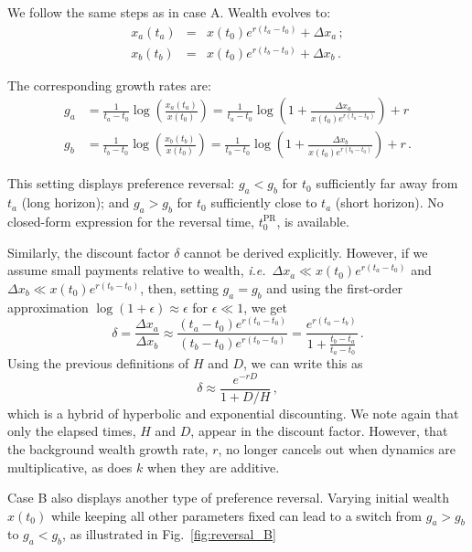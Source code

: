 \documentclass[11pt]{article}
\newcommand{\ie}{{\it i.e.}\ }
\newcommand{\fref}[1]{Fig.~\ref{fig:#1}}
\newcommand{\be}{\begin{equation}}
\newcommand{\ee}{\end{equation}}
\newcommand{\bea}{\begin{eqnarray}}
\newcommand{\eea}{\end{eqnarray}}
\newcommand{\Dx}{\Delta x}
\newcommand{\del}{D}
\newcommand{\hor}{H}
\numberwithin{equation}{section}
\begin{document}
We follow the same steps as in case A. Wealth evolves to:
\bea
x_a\left(t_a\right) &=& x\left(t_0\right) e^{r(t_a-t_0)} + \Dx_a\,;\\
x_b\left(t_b\right) &=& x\left(t_0\right) e^{r(t_b-t_0)} + \Dx_b\,.
\eea

The corresponding growth rates are:
\bea
g_a &= \frac{1}{t_a-t_0} \log{\left(\frac{x_a\left(t_a\right)}{x\left(t_0\right)}\right)} = \frac{1}{t_a-t_0}\log{\left(1 + \frac{\Dx_a}{x\left(t_0\right)e^{r(t_a-t_0)}}\right)} + r\\
g_b &= \frac{1}{t_b-t_0} \log{\left(\frac{x_b\left(t_b\right)}{x\left(t_0\right)}\right)} = \frac{1}{t_b-t_0}\log{\left(1 + \frac{\Dx_b}{x\left(t_0\right)e^{r(t_b-t_0)}}\right)} + r\,.
\eea

This setting displays preference reversal: $g_a<g_b$ for $t_0$ sufficiently far away from $t_a$ (long horizon); and $g_a>g_b$ for $t_0$ sufficiently close to $t_a$ (short horizon). No closed-form expression for the reversal time, $t_0^\text{PR}$, is available.

Similarly, the discount factor $\delta$ cannot be derived explicitly. However, if we assume small payments relative to wealth, \ie $\Dx_a \ll x\left(t_0\right)e^{r(t_a-t_0)}$ and $\Dx_b \ll x\left(t_0\right)e^{r(t_b-t_0)}$, then, setting $g_a=g_b$ and using the first-order approximation $\log(1+\epsilon)\approx\epsilon$ for $\epsilon\ll1$, we get
\be
\delta = \frac{\Dx_a}{\Dx_b} \approx \frac{(t_a-t_0)e^{r(t_a-t_0)}}{(t_b-t_0)e^{r(t_b-t_0)}} =
\frac{e^{r(t_a-t_b)}}{1+\frac{t_b-t_a}{t_a-t_0}}\,.
\ee
Using the previous definitions of $\hor$ and $\del$, we can write this as
\be
\delta \approx \frac{e^{-r\del}}{1+\del/\hor}\,,
\ee
which is a hybrid of hyperbolic and exponential discounting. We note again that only the elapsed times, $\hor$ and $\del$, appear in the discount factor. However, that the background wealth growth rate, $r$, no longer cancels out when dynamics are multiplicative, as does $k$ when they are additive.

Case B also displays another type of preference reversal. Varying initial wealth $x(t_0)$ while keeping all other parameters fixed can lead to a switch from $g_a>g_b$ to $g_a<g_b$, as illustrated in \fref{reversal_B}
\end{document}
